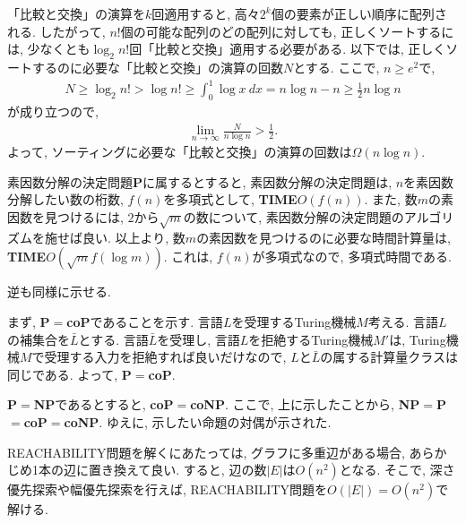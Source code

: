 \begin{ex}
    \label{ex3.15}
    「比較と交換」の演算を$k$回適用すると, 高々$2^k$個の要素が正しい順序に配列される.
    したがって, $n!$個の可能な配列のどの配列に対しても, 正しくソートするには,
    少なくとも$\log_2  n!$回「比較と交換」適用する必要がある. 以下では, 正しくソートするのに必要な「比較と交換」の演算の回数$N$とする. ここで,
    $n \geq e^2$で,
    \begin{align*}
        N \geq \log_2  n! > \log n! \geq \int_0^1 \log x \ dx = n \log n - n \geq \frac{1}{2}n \log n
    \end{align*}
    が成り立つので,
    \begin{align*}
        \lim_{n \to \infty} \frac{N}{n \log n} > \frac{1}{2}.
    \end{align*}
    よって, ソーティングに必要な「比較と交換」の演算の回数は$\Omega(n \log n)$.
\end{ex}

\begin{ex}
    \label{ex3.16}
\end{ex}

\begin{ex}
    \label{ex3.17}
    素因数分解の決定問題{\bf P}に属するとすると,  素因数分解の決定問題は, $n$を素因数分解したい数の桁数, $f(n)$を多項式として, {\bf TIME}$O\left(f(n)\right)$. また, 数$m$の素因数を見つけるには, $2$から$\sqrt{m}$の数について, 素因数分解の決定問題のアルゴリズムを施せば良い. 以上より, 数$m$の素因数を見つけるのに必要な時間計算量は, {\bf TIME}$O\left(\sqrt{m}f(\log m)\right)$. これは, $f(n)$が多項式なので, 多項式時間である.
    \par
    逆も同様に示せる.
\end{ex}

\begin{ex}
    \label{ex3.18}
    まず, {\bf P}$=${\bf coP}であることを示す. 言語$L$を受理するTuring機械$M$考える. 言語$L$の補集合を$\bar{L}$とする. 言語$\bar{L}$を受理し, 言語$L$を拒絶するTuring機械$M'$は, Turing機械$M$で受理する入力を拒絶すれば良いだけなので, $L$と$\bar{L}$の属する計算量クラスは同じである. よって, {\bf P}$=${\bf coP}.
    \par
    {\bf P}$=${\bf NP}であるとすると, {\bf coP}$=${\bf coNP}. ここで, 上に示したことから, {\bf NP}$=${\bf P}$=${\bf coP}$=${\bf coNP}. ゆえに, 示したい命題の対偶が示された.
\end{ex}

\begin{ex}
    \label{ex3.19}
    REACHABILITY問題を解くにあたっては, グラフに多重辺がある場合, あらかじめ1本の辺に置き換えて良い. すると, 辺の数$|E|$は$O(n^2)$となる. そこで, 深さ優先探索や幅優先探索を行えば, REACHABILITY問題を$O(|E|) = O(n^2)$で解ける.
\end{ex}

